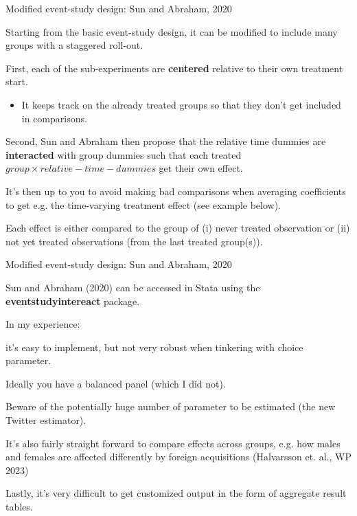 \documentclass[notes,11pt, aspectratio=169]{beamer}
\newenvironment{wideitemize}{\itemize\addtolength{\itemsep}{10pt}}{\enditemize}
\begin{document}
\begin{frame}{Modified event-study design: Sun and Abraham, 2020}
\begin{wideitemize}
    \item Starting from the basic event-study design, it can be modified to include many groups with a staggered roll-out.
    \item First, each of the sub-experiments are \textbf{centered} relative to their own treatment start.
    
    \begin{itemize}
        \item It keeps track on the already treated groups so that they don't get included in comparisons.
    \end{itemize}
    
    \item Second, Sun and Abraham then propose that the relative time dummies are \textbf{interacted} with group dummies such that each treated $group\times relative-time-dummies$ get their own effect. 
    
    \item It's then up to you to avoid making bad comparisons when averaging coefficients to get e.g. the time-varying treatment effect (see example below).

    \item Each effect is either compared to the group of (i) never treated observation or (ii) not yet treated observations (from the last treated group(s)).
    
\end{wideitemize}
\end{frame}

\begin{frame}{Modified event-study design: Sun and Abraham, 2020}
\begin{wideitemize}
    \item Sun and Abraham (2020) can be accessed in Stata using the \textbf{eventstudyintereact} package. 
    \item In my experience: 
    \begin{wideitemize}
    \item it's easy to implement, but not very robust when tinkering with choice parameter.
    \item Ideally you have a balanced panel (which I did not).
    \item Beware of the potentially huge number of parameter to be estimated (the new Twitter estimator).
    \item It's also fairly straight forward to compare effects across groups, e.g. how males and females are affected differently by foreign acquisitions (Halvarsson et. al., WP 2023) 
    \item Lastly, it's very difficult to get customized output in the form of aggregate result tables. 
    \end{wideitemize}
\end{wideitemize}
\end{frame}
\end{document}
